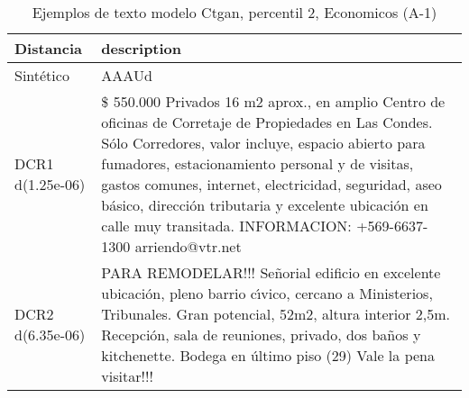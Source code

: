 \begin{table}[H]
\centering
\fontsize{10}{14}\selectfont
\caption{Ejemplos de texto modelo Ctgan, percentil 2, Economicos (A-1)}
\label{table-example-economicos-a-1-ctgan-2p-text}
\begin{tabular}{|l|m{35em}|}
\hline
\rowcolor[gray]{0.8}
Distancia & description \\
\hline Sintético & AAAUd \\
\hline DCR1 d(1.25e-06) & \$ 550.000 Privados 16 m2 aprox., en amplio Centro de oficinas de Corretaje de Propiedades en Las Condes. S\'olo Corredores, valor incluye, espacio abierto para fumadores, estacionamiento personal y de visitas, gastos comunes, internet, electricidad, seguridad, aseo b\'asico, direcci\'on tributaria y excelente ubicaci\'on en calle muy transitada.  INFORMACION: +569-6637-1300 arriendo@vtr.net \\
\hline DCR2 d(6.35e-06) & PARA REMODELAR!!!  Se\~norial edificio en excelente ubicaci\'on, pleno barrio c{\'\i}vico, cercano a Ministerios, Tribunales. Gran potencial, 52m2, altura interior 2,5m. Recepci\'on, sala de reuniones, privado, dos ba\~nos y kitchenette. Bodega en \'ultimo piso (29) Vale la pena visitar!!! \\
\hline
\end{tabular}
\end{table}
